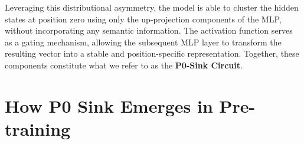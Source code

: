 \documentclass[]{template}
\theoremstyle{plain}
\theoremstyle{definition}
\theoremstyle{remark}
\begin{document}
\begin{table}[t]
\caption{Proportion of $n$-grams in which the same token appears $n$ times consecutively, measured under different tokenizers on a subset of FineWeb-Edu 10B dataset~\citep{lozhkov2024fineweb-edu}. This analysis confirms that repeated-token patterns are rare and are unlikely to introduce out-of-distribution artifacts that could confound our findings.}
\label{bos-vs-non-bos-tab2}
\end{table}

Leveraging this distributional asymmetry, the model is able to cluster the hidden states at position zero using only the up-projection components of the MLP, without incorporating any semantic information. The activation function serves as a gating mechanism, allowing the subsequent MLP layer to transform the resulting vector into a stable and position-specific representation. Together, these components constitute what we refer to as the \textbf{P0-Sink Circuit}.


\section{How P0 Sink Emerges in Pre-training}

\end{document}
